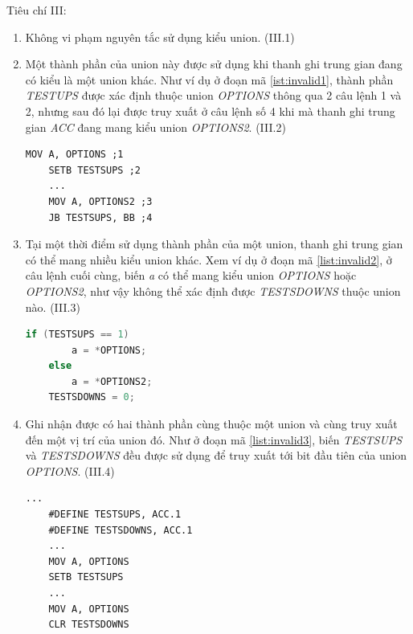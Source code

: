 Tiêu chí III:
\begin{enumerate}
	\item Không vi phạm nguyên tắc sử dụng kiểu union. (III.1)
	\item Một thành phần của union này được sử dụng khi thanh ghi trung gian đang có kiểu là một union khác. Như ví dụ ở đoạn mã \ref{ist:invalid1}, thành phần \textit{TESTUPS} được xác định thuộc union \textit{OPTIONS} thông qua 2 câu lệnh 1 và 2, nhưng sau đó lại được truy xuất ở câu lệnh số 4 khi mà thanh ghi trung gian \textit{ACC} đang mang kiểu union \textit{OPTIONS2}. (III.2)
	\begin{lstlisting}[caption={Đoạn mã có một biến bit thuộc nhiều bộ biến khác nhau},label={list:invalid1}]
	MOV A, OPTIONS ;1
	SETB TESTSUPS ;2
	...
	MOV A, OPTIONS2 ;3
	JB TESTSUPS, BB ;4
	\end{lstlisting}
	\item Tại một thời điểm sử dụng thành phần của một union, thanh ghi trung gian có thể mang nhiều kiểu union khác. Xem ví dụ ở đoạn mã \ref{list:invalid2}, ở câu lệnh cuối cùng, biến \textit{a} có thể mang kiểu union \textit{OPTIONS} hoặc \textit{OPTIONS2}, như vậy không thể xác định được \textit{TESTSDOWNS} thuộc union nào. (III.3)
	\begin{lstlisting}[caption={Đoạn mã ACC có thể mang nhiều giá trị vùng nhớ khác nhau},label={list:invalid2}, language=c++]
	if (TESTSUPS == 1)
		a = *OPTIONS;
	else
		a = *OPTIONS2;
	TESTSDOWNS = 0;
	\end{lstlisting}
	\item Ghi nhận được có hai thành phần cùng thuộc một union và cùng truy xuất đến một vị trí của union đó. Như ở đoạn mã \ref{list:invalid3}, biến \textit{TESTSUPS} và \textit{TESTSDOWNS} đều được sử dụng để truy xuất tới bit đầu tiên của union \textit{OPTIONS}. (III.4)
	\begin{lstlisting}[caption={Đoạn mã có 2 biến bit cùng một vị trí và đều được ghi nhận cùng bộ với một biến byte},label={list:invalid3}]
	...
	#DEFINE TESTSUPS, ACC.1
	#DEFINE TESTSDOWNS, ACC.1
	...
	MOV A, OPTIONS
	SETB TESTSUPS
	...
	MOV A, OPTIONS
	CLR TESTSDOWNS
	\end{lstlisting}
\end{enumerate}

